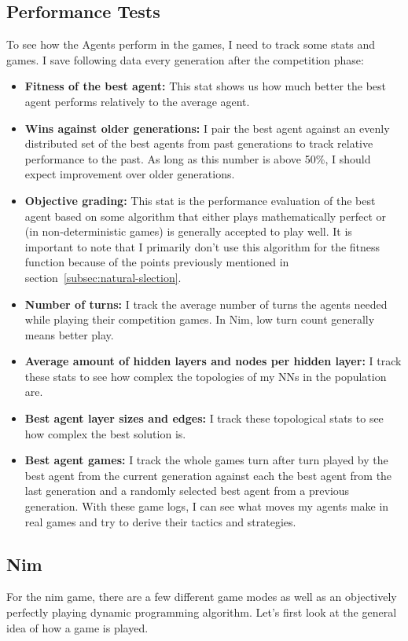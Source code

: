 \documentclass[11pt]{report}
\begin{document}
\begin{enumerate}
    \subsection{Performance Tests}\label{subsec:performance-tests}
    To see how the Agents perform in the games, I need to track some stats and games.
    I save following data every generation after the competition phase:
    \begin{itemize}
        \item \textbf{Fitness of the best agent:} This stat shows us how much better the best agent performs relatively to the average agent.
        \item \textbf{Wins against older generations:} I pair the best agent against an evenly distributed set of the best agents from past generations to track relative performance to the past.
        As long as this number is above 50\%, I should expect improvement over older generations.
        \item \textbf{Objective grading:} This stat is the performance evaluation of the best agent based on some algorithm that either plays mathematically perfect or (in non-deterministic games) is generally accepted to play well.
        It is important to note that I primarily don't use this algorithm for the fitness function because of the points previously mentioned in section~\ref{subsec:natural-slection}.
        \item \textbf{Number of turns:} I track the average number of turns the agents needed while playing their competition games.
        In Nim, low turn count generally means better play.
        \item \textbf{Average amount of hidden layers and nodes per hidden layer:} I track these stats to see how complex the topologies of my NNs in the population are.
        \item \textbf{Best agent layer sizes and edges:} I track these topological stats to see how complex the best solution is.
        \item \textbf{Best agent games:} I track the whole games turn after turn played by the best agent from the current generation against each the best agent from the last generation and a randomly selected best agent from a previous generation.
        With these game logs, I can see what moves my agents make in real games and try to derive their tactics and strategies.
    \end{itemize}

    \subsection{Nim}\label{subsec:nim-implementation}
    For the nim game, there are a few different game modes as well as an objectively perfectly playing dynamic programming algorithm.
    Let's first look at the general idea of how a game is played.


\end{enumerate}
\end{document}
